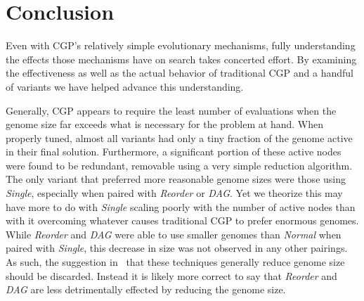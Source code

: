 \documentclass[journal]{IEEEtran}
\begin{document}
%





\section{Conclusion}
\label{sec:conclusion}
Even with CGP's relatively simple evolutionary mechanisms, fully understanding
the effects those mechanisms have on search takes concerted effort.  By examining
the effectiveness as well as the actual behavior of traditional CGP and
a handful of variants we have helped advance this understanding.

Generally, CGP appears to require the least number of evaluations when the genome
size far exceeds what is necessary for the problem at hand.  When properly tuned,
almost all variants had only a tiny fraction of the genome active in their final
solution.  Furthermore, a significant portion of these active nodes were found
to be redundant, removable using a very simple reduction algorithm.  The only
variant that preferred more reasonable genome sizes were those using \emph{Single},
especially when paired with \emph{Reorder} or \emph{DAG}.  Yet we theorize this may
have more to do with \emph{Single} scaling poorly with the number of active nodes
than with it overcoming whatever causes traditional CGP to prefer enormous genomes.
While \emph{Reorder} and \emph{DAG} were able to use smaller genomes than \emph{Normal}
when paired with \emph{Single}, this decrease in size was not observed in any other
pairings.  As such, the suggestion in~\cite{goldman:2013:ordering} that these
techniques generally reduce genome size should be discarded.  Instead it is likely
more correct to say that \emph{Reorder} and \emph{DAG} are less detrimentally effected
by reducing the genome size.
\end{document}
